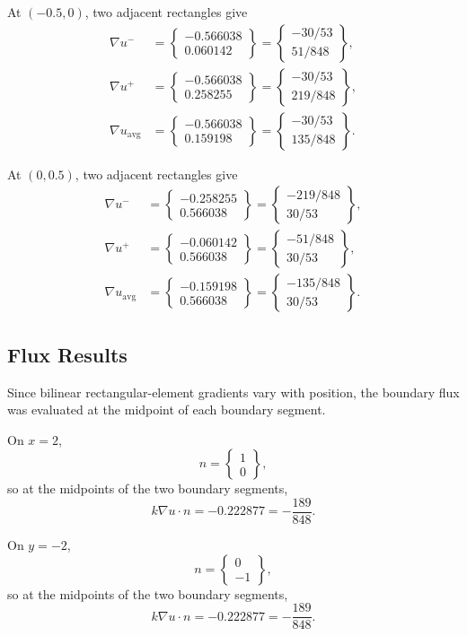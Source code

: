\documentclass[14pt,a4paper]{article}
\newcommand{\grad}{\nabla}
\newcommand{\vect}[1]{\begin{Bmatrix}#1\end{Bmatrix}}
\begin{document}
At $(-0.5,0)$, two adjacent rectangles give
\begin{align}
    \grad u^{-} &= \vect{-0.566038\\0.060142}
    =\vect{-30/53\\51/848},\\
    \grad u^{+} &= \vect{-0.566038\\0.258255}
    =\vect{-30/53\\219/848},\\
    \grad u_{\mathrm{avg}} &= \vect{-0.566038\\0.159198}
    =\vect{-30/53\\135/848}.
\end{align}

At $(0,0.5)$, two adjacent rectangles give
\begin{align}
    \grad u^{-} &= \vect{-0.258255\\0.566038}
    =\vect{-219/848\\30/53},\\
    \grad u^{+} &= \vect{-0.060142\\0.566038}
    =\vect{-51/848\\30/53},\\
    \grad u_{\mathrm{avg}} &= \vect{-0.159198\\0.566038}
    =\vect{-135/848\\30/53}.
\end{align}

\subsection{Flux Results}

Since bilinear rectangular-element gradients vary with position, the boundary flux was evaluated at the midpoint of each boundary segment.

On $x=2$,
\begin{equation}
    n=\vect{1\\0},
\end{equation}
so at the midpoints of the two boundary segments,
\begin{equation}
    k\grad u\cdot n=-0.222877=-\frac{189}{848}.
\end{equation}

On $y=-2$,
\begin{equation}
    n=\vect{0\\-1},
\end{equation}
so at the midpoints of the two boundary segments,
\begin{equation}
    k\grad u\cdot n=-0.222877=-\frac{189}{848}.
\end{equation}
\end{document}
